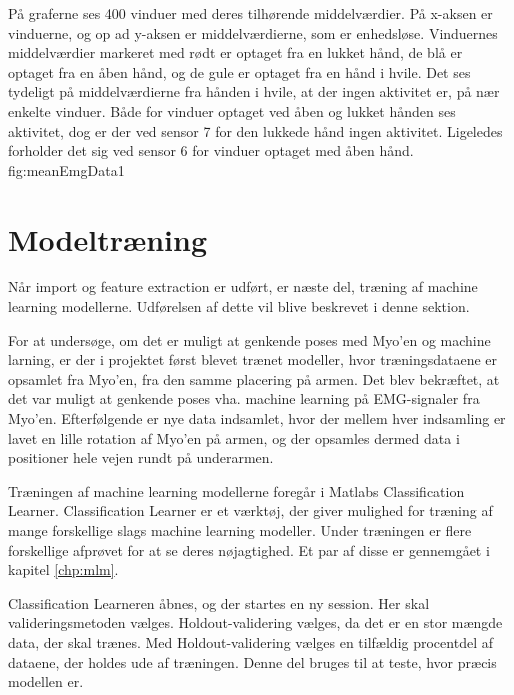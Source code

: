 {
	På graferne ses 400 vinduer med deres tilhørende middelværdier. På x-aksen er vinduerne, og op ad y-aksen er middelværdierne, som er enhedsløse. Vinduernes middelværdier markeret med rødt er optaget fra en lukket hånd, de blå er optaget fra en åben hånd, og de gule er optaget fra en hånd i hvile. Det ses tydeligt på middelværdierne fra hånden i hvile, at der ingen aktivitet er, på nær enkelte vinduer. Både for vinduer optaget ved åben og lukket hånden ses aktivitet, dog er der ved sensor 7 for den lukkede hånd ingen aktivitet. Ligeledes forholder det sig ved sensor 6 for vinduer optaget med åben hånd.
 }{fig:meanEmgData}{1}

\section{Modeltræning}

Når import og feature extraction er udført, er næste del, træning af machine learning modellerne. Udførelsen af dette vil blive beskrevet i denne sektion.


For at undersøge, om det er muligt at genkende poses med Myo'en og machine larning, er der i projektet først blevet trænet modeller, hvor træningsdataene er opsamlet fra Myo'en, fra den samme placering på armen. Det blev bekræftet, at det var muligt at genkende poses vha. machine learning på EMG-signaler fra Myo'en. Efterfølgende er nye data indsamlet, hvor der mellem hver indsamling er lavet en lille rotation af Myo'en på armen, og der opsamles dermed data i positioner hele vejen rundt på underarmen.

Træningen af machine learning modellerne foregår i Matlabs Classification Learner\citep{matlabClassificationLearner}. Classification Learner er et værktøj, der giver mulighed for træning af mange forskellige slags machine learning modeller. Under træningen er flere forskellige afprøvet for at se deres nøjagtighed. Et par af disse er gennemgået i kapitel \ref{chp:mlm}.

Classification Learneren åbnes, og der startes en ny session. Her skal valideringsmetoden vælges. Holdout-validering vælges, da det er en stor mængde data, der skal trænes. Med Holdout-validering vælges en tilfældig procentdel af dataene, der holdes ude af træningen. Denne del bruges til at teste, hvor præcis modellen er\citep{matlabValidation}.

